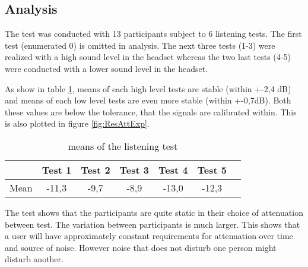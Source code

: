 \subsection{Analysis}

The test was conducted with 13 participants subject to 6 listening tests. The first test (enumerated 0) is omitted in analysis. The next three tests (1-3) were realized with a high sound level in the headset whereas the two last tests (4-5) were conducted with a lower sound level in the headset. 


As show in table \ref{tab:MeanListeningResults}, means of each high level tests are stable (within +-2,4 dB) and means of each low level tests are even more stable (within +-0,7dB). Both these values are below the tolerance, that the signals are calibrated within. This is also plotted in figure \ref{fig:ResAttExp}. 

\begin{table}[H]
	\centering
	\begin{tabular}{*{7}{c}}
		\hline
		& Test 1 & Test 2 & Test 3  & Test 4  & Test 5  
		\\
		\hline
		Mean & -11,3 & -9,7 & -8,9	 & -13,0 & -12,3 \\
		\hline
	\end{tabular}
	\caption{means of the listening test}
	\label{tab:MeanListeningResults}
\end{table}
The test shows that the participants are quite static in their choice of attenuation between test. The variation between participants is much larger. This shows that a user will have approximately constant requirements for attenuation over time and source of noise. However noise that does not disturb one person might disturb another.  

